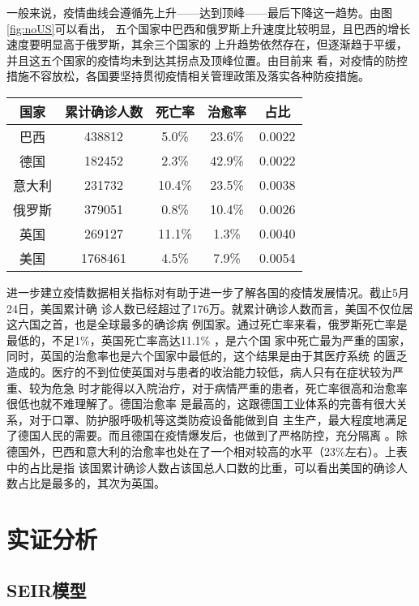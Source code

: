 \documentclass[lang=cn,11pt,a4paper,cite=authoryear]{elegantpaper}
\begin{document}
一般来说，疫情曲线会遵循先上升——达到顶峰——最后下降这一趋势。由图\ref{fig:noUS}可以看出，
五个国家中巴西和俄罗斯上升速度比较明显，且巴西的增长速度要明显高于俄罗斯，其余三个国家的
上升趋势依然存在，但逐渐趋于平缓，并且这五个国家的疫情均未到达其拐点及顶峰位置。由目前来
看，对疫情的防控措施不容放松，各国要坚持贯彻疫情相关管理政策及落实各种防疫措施。

\begin{table}[htp]
	\centering
	\begin{tabular}{ccccc}
		\hline
		国家 & 累计确诊人数 & 死亡率 & 治愈率 & 占比 \\
		\hline
		巴西 & 438812	& 5.0\% & 23.6\% & 0.0022 \\
		德国 & 182452 & 2.3\%	& 42.9\% & 0.0022 \\
		意大利 & 231732& 10.4\% & 23.5\% & 0.0038 \\
		俄罗斯 & 379051 & 0.8\% & 10.4\% & 0.0026 \\
		英国 & 269127 & 11.1\% & 1.3\% & 0.0040 \\
		美国 & 1768461 & 4.5\% & 7.9\% & 0.0054 \\
		\hline
	\end{tabular}
\end{table}

进一步建立疫情数据相关指标对有助于进一步了解各国的疫情发展情况。截止5月24日，美国累计确
诊人数已经超过了176万。就累计确诊人数而言，美国不仅位居这六国之首，也是全球最多的确诊病
例国家。通过死亡率来看，俄罗斯死亡率是最低的，不足1\%，英国死亡率高达11.1\% ，是六个国
家中死亡最为严重的国家，同时，英国的治愈率也是六个国家中最低的，这个结果是由于其医疗系统
的匮乏造成的。医疗的不到位使英国对与患者的收治能力较低，病人只有在症状较为严重、较为危急
时才能得以入院治疗，对于病情严重的患者，死亡率很高和治愈率很低也就不难理解了。德国治愈率
是最高的，这跟德国工业体系的完善有很大关系，对于口罩、防护服呼吸机等这类防疫设备能做到自
主生产，最大程度地满足了德国人民的需要。而且德国在疫情爆发后，也做到了严格防控，充分隔离
。除德国外，巴西和意大利的治愈率也处在了一个相对较高的水平（23\%左右）。上表中的占比是指
该国累计确诊人数占该国总人口数的比重，可以看出美国的确诊人数占比是最多的，其次为英国。

\section{实证分析}

\subsection{SEIR模型}
\end{document}
